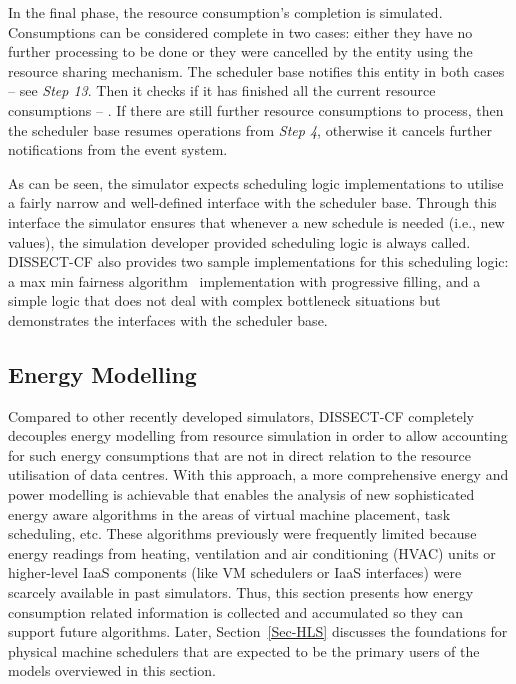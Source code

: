 \documentclass[sort, compress, 5p]{elsarticle}
\begin{document}
In the final phase, the resource consumption's completion is simulated. Consumptions can be considered complete in two cases: either they have no further processing to be done or they were cancelled by the entity using the resource sharing mechanism. The scheduler base notifies this entity in both cases  -- see \emph{Step 13}. Then it checks if it has finished all the current resource consumptions -- . If there are still further resource consumptions to process, then the scheduler base resumes operations from \emph{Step 4}, otherwise it cancels further notifications from the event system.

As can be seen, the simulator expects scheduling logic implementations to utilise a fairly narrow and well-defined interface with the scheduler base. Through this interface the simulator ensures that whenever a new schedule is needed (i.e., new  values), the simulation developer provided scheduling logic is always called. DISSECT-CF also provides two sample implementations for this scheduling logic: a max min fairness algorithm~\cite{MaxMinFair} implementation with progressive filling, and a simple logic that does not deal with complex bottleneck situations but demonstrates the interfaces with the scheduler base.

\subsection{Energy Modelling} \label{Sec-EnergyModel}

Compared to other recently developed simulators, DISSECT-CF completely decouples energy modelling from resource simulation in order to allow accounting for such energy consumptions that are not in direct relation to the resource utilisation of data centres. With this approach, a more comprehensive energy and power modelling is achievable that enables the analysis of new sophisticated energy aware algorithms in the areas of virtual machine placement, task scheduling, etc. These algorithms previously were frequently limited because energy readings from heating, ventilation and air conditioning (HVAC) units or higher-level IaaS components (like VM schedulers or IaaS interfaces) were scarcely available in past simulators. Thus, this section presents how energy consumption related information is collected and accumulated so they can support future algorithms. Later, Section~\ref{Sec-HLS} discusses the foundations for physical machine schedulers that are expected to be the primary users of the models overviewed in this section.
\end{document}
